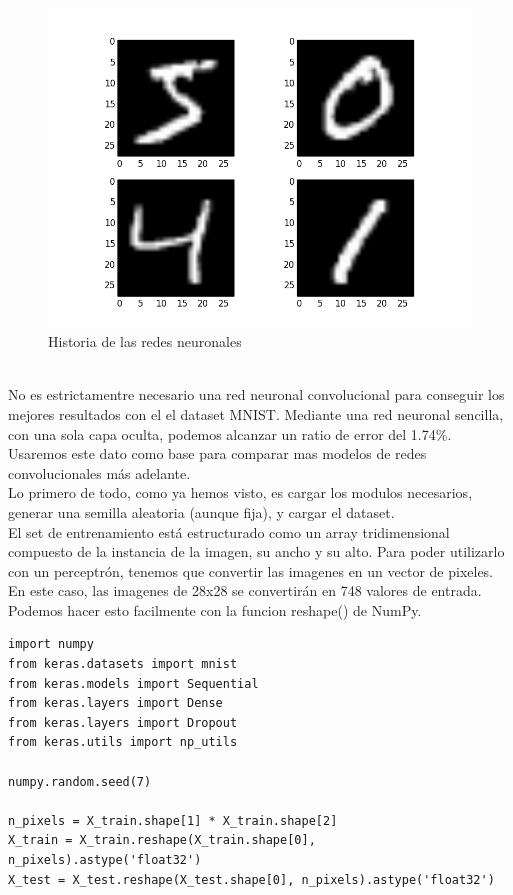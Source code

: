 \mbox{}
\begin{figure}[htp]
\centering
\includegraphics[scale=0.60]{images/mnist.png}
\caption{Historia de las redes neuronales}
\end{figure}\\
No es estrictamentre necesario una red neuronal convolucional para conseguir los mejores resultados con el el dataset MNIST. Mediante una red neuronal sencilla, con una sola capa oculta, podemos alcanzar un ratio de error del 1.74\%. Usaremos este dato como base para comparar mas modelos de redes convolucionales más adelante.\\
Lo primero de todo, como ya hemos visto, es cargar los modulos necesarios, generar una semilla aleatoria (aunque fija), y cargar el dataset.\\
El set de entrenamiento está estructurado como un array tridimensional compuesto de la instancia de la imagen, su ancho y su alto. Para poder utilizarlo con un perceptrón, tenemos que convertir las imagenes en un vector de pixeles. En este caso, las imagenes de 28x28 se convertirán en 748 valores de entrada. Podemos hacer esto facilmente  con la funcion reshape() de NumPy.
\begin{verbatim}
import numpy
from keras.datasets import mnist
from keras.models import Sequential
from keras.layers import Dense
from keras.layers import Dropout
from keras.utils import np_utils

numpy.random.seed(7)

n_pixels = X_train.shape[1] * X_train.shape[2]
X_train = X_train.reshape(X_train.shape[0], n_pixels).astype('float32')
X_test = X_test.reshape(X_test.shape[0], n_pixels).astype('float32')
\end{verbatim}

